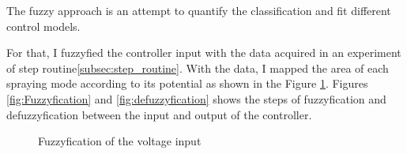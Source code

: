         The fuzzy approach is an attempt to quantify the classification and fit different control models.

        For that, I fuzzyfied the controller input with the data acquired in an experiment of step routine\ref{subsec:step_routine}. With the data, I mapped the area of each spraying mode according to its potential as shown in the Figure \ref{fig:fuzzy_input}.
        Figures \ref{fig:Fuzzyfication} and \ref{fig:defuzzyfication} shows the steps of fuzzyfication and defuzzyfication between the input and output of the controller.

        \begin{multicols}{2}

            \begin{figure}[H]
                \centering
                \caption{Fuzzyfication of the voltage input}
                \label{fig:fuzzy_input}
            \end{figure}


\end{multicols}
